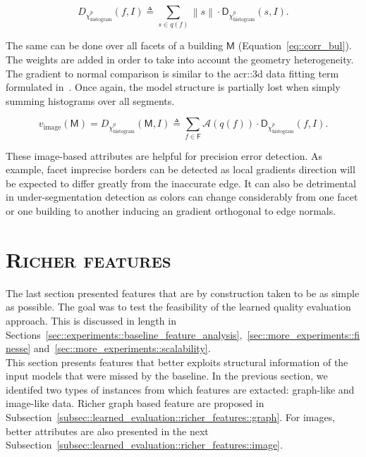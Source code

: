         \begin{equation}
            \label{eq::corr_fac}
            D_{\chi^p_{\operatorname{histogram}}}\left(f, I\right) \triangleq \sum_{s \in q\left(f\right)} \left\rVert s \right\lVert \cdot \mathsf{D}_{\chi^p_{\operatorname{histogram}}}(s, I).
        \end{equation}

        The same can be done over all facets of a building $\mathsf{M}$ (Equation~\ref{eq::corr_bul}).
        The weights are added in order to take into account the geometry heterogeneity.
        The gradient to normal comparison is similar to the \gls{acr::3d} data fitting term formulated in~\parencite{li2016manhattan}.
        Once again, the model structure is partially lost when simply summing histograms over all segments.

        \begin{equation}
            \label{eq::corr_bul}
            v_{\text{image}}\left(\mathsf{M}\right) = D_{\chi^p_{\operatorname{histogram}}}\left(\mathsf{M}, I\right) \triangleq \sum_{f \in \mathsf{F}} \mathscr{A}\left(q\left(f\right)\right) \cdot \mathsf{D}_{\chi^p_{\operatorname{histogram}}}(f, I).
        \end{equation}
        
        These image-based attributes are helpful for precision error detection.
        As example, facet imprecise borders can be detected as local gradients direction will be expected to differ greatly from the inaccurate edge.
        It can also be detrimental in under-segmentation detection as colors can change considerably from one facet or one building to another inducing an gradient orthogonal to edge normals.

\section{\textsc{Richer features}}
    \label{sec::learned_evaluation::richer_features}
    The last section presented features that are by construction taken to be as simple as possible.
    The goal was to test the feasibility of the learned quality evaluation approach.
    This is discussed in length in Sections~\ref{sec::experiments::baseline_feature_analysis},~\ref{sec::more_experiments::finesse} and~\ref{sec::more_experiments::scalability}.\\

    This section presents features that better exploits structural information of the input models that were missed by the baseline.
    In the previous section, we identifed two types of instances from which features are extacted: graph-like and image-like data.
    Richer graph based feature are proposed in Subsection~\ref{subsec::learned_evaluation::richer_features::graph}.
    For images, better attributes are also presented in the next Subsection~\ref{subsec::learned_evaluation::richer_features::image}.


